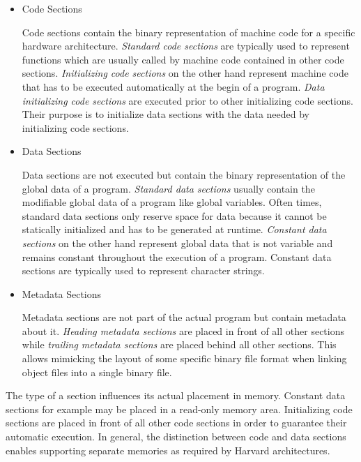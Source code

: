 \begin{itemize}

\item Code Sections\nopagebreak

Code sections contain the binary representation of machine code for a specific hardware architecture.
\emph{Standard code sections} are typically used to represent functions which are usually called by machine code contained in other code sections.
\emph{Initializing code sections} on the other hand represent machine code that has to be executed automatically at the begin of a program.
\emph{Data initializing code sections} are executed prior to other initializing code sections.
Their purpose is to initialize data sections with the data needed by initializing code sections.

\item Data Sections\nopagebreak

Data sections are not executed but contain the binary representation of the global data of a program.
\emph{Standard data sections} usually contain the modifiable global data of a program like global variables.
Often times, standard data sections only reserve space for data because it cannot be statically initialized and has to be generated at runtime.
\emph{Constant data sections} on the other hand represent global data that is not variable and remains constant throughout the execution of a program.
Constant data sections are typically used to represent character strings.

\item Metadata Sections\nopagebreak

Metadata sections are not part of the actual program but contain metadata about it.
\emph{Heading metadata sections} are placed in front of all other sections while \emph{trailing metadata sections} are placed behind all other sections.
This allows mimicking the layout of some specific binary file format when linking object files into a single binary file.

\end{itemize}

The type of a section influences its actual placement in memory.
Constant data sections for example may be placed in a read-only memory area.
Initializing code sections are placed in front of all other code sections in order to guarantee their automatic execution.
In general, the distinction between code and data sections enables supporting separate memories as required by Harvard architectures.

